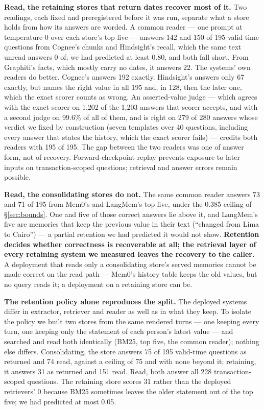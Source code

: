 \documentclass[conference]{IEEEtran}
\begin{document}
\textbf{Read, the retaining stores that return dates recover most of it.} Two readings, each
fixed and preregistered before it was run, separate what a store holds from how
its answers are worded. A common reader --- one prompt at temperature 0 over
each store's top five --- answers 142 and 150 of 195 valid-time questions from
Cognee's chunks and Hindsight's recall, which the same text unread answers 0 of;
we had predicted at least 0.80, and both fall short. From Graphiti's facts, which
mostly carry no dates, it answers 22. The systems' own readers do better.
Cognee's answers 192 exactly. Hindsight's answers only 67 exactly, but names
the right value in all 195 and, in 128, then the later one, which the exact
scorer counts as wrong. An asserted-value judge
--- which agrees with the exact scorer on 1{,}202 of the 1{,}203 answers that scorer
accepts, and with a second judge on 99.6\% of all of them, and is right on 279
of 280 answers whose verdict we fixed by construction (seven templates over 40
questions, including every answer that states the history, which the exact
scorer fails) --- credits both readers with 195 of 195. The gap between the two readers was one of answer form,
not of recovery. Forward-checkpoint replay prevents exposure to later inputs on
transaction-scoped questions; retrieval and answer errors remain possible.

\textbf{Read, the consolidating stores do not.} The same common reader answers
73 and 71 of 195 from Mem0's and LangMem's top five, under the 0.385 ceiling of
\S\ref{sec:bounds}. One and five of those correct answers lie above it, and
LangMem's five are memories that keep the previous value in their text
(``changed from Lima to Cairo'') --- a partial retention we had predicted it would
not show. \textbf{Retention decides whether correctness is recoverable at all;
the retrieval layer of every retaining system we measured leaves the recovery to
the caller.} A deployment that reads only a consolidating store's served
memories cannot be made correct on the read path --- Mem0's history table keeps
the old values, but no query reads it; a deployment on a retaining store can be.

\textbf{The retention policy alone reproduces the split.} The deployed systems
differ in extractor, retriever and reader as well as in what they keep. To
isolate the policy we built two stores from the same rendered turns --- one
keeping every turn, one keeping only the statement of each person's latest
value --- and searched and read both identically (BM25, top five, the common
reader); nothing else differs. Consolidating, the store answers 75 of 195
valid-time questions as returned and 74 read, against a ceiling of 75 and with
none beyond it; retaining, it answers 31 as returned and 151 read. Read, both
answer all 228 transaction-scoped questions. The retaining store scores 31
rather than the deployed retrievers' 0 because BM25 sometimes leaves the older
statement out of the top five; we had predicted at most 0.05.
\end{document}

